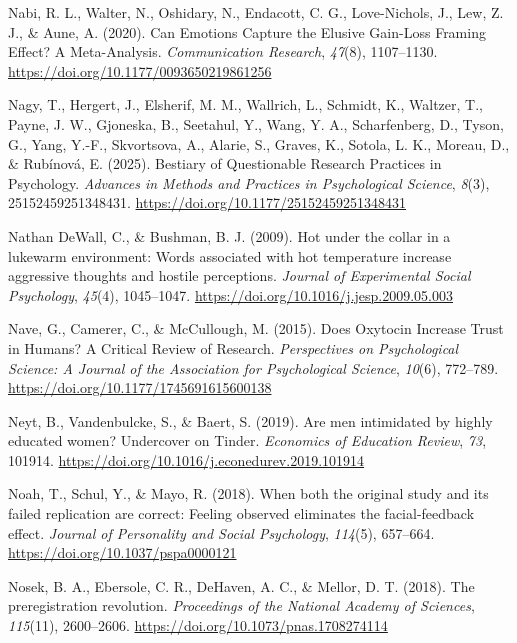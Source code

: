 \documentclass[
  letterpaper,
]{book}
\newlength{\cslhangindent}
\newenvironment{CSLReferences}[2] %
 {\begin{list}{}{%
  \setlength{\itemindent}{0pt}
  \setlength{\leftmargin}{0pt}
  \setlength{\parsep}{0pt}
  \ifodd #1
   \setlength{\leftmargin}{\cslhangindent}
   \setlength{\itemindent}{-1\cslhangindent}
  \fi
  \setlength{\itemsep}{#2\baselineskip}}}
 {\end{list}}
\begin{document}
\begin{CSLReferences}{1}{0}
Nabi, R. L., Walter, N., Oshidary, N., Endacott, C. G., Love-Nichols,
J., Lew, Z. J., \& Aune, A. (2020). Can {Emotions} {Capture} the
{Elusive} {Gain}-{Loss} {Framing} {Effect}? {A} {Meta}-{Analysis}.
\emph{Communication Research}, \emph{47}(8), 1107--1130.
\url{https://doi.org/10.1177/0093650219861256}

Nagy, T., Hergert, J., Elsherif, M. M., Wallrich, L., Schmidt, K.,
Waltzer, T., Payne, J. W., Gjoneska, B., Seetahul, Y., Wang, Y. A.,
Scharfenberg, D., Tyson, G., Yang, Y.-F., Skvortsova, A., Alarie, S.,
Graves, K., Sotola, L. K., Moreau, D., \& Rubínová, E. (2025). Bestiary
of {Questionable} {Research} {Practices} in {Psychology}. \emph{Advances
in Methods and Practices in Psychological Science}, \emph{8}(3),
25152459251348431. \url{https://doi.org/10.1177/25152459251348431}

Nathan DeWall, C., \& Bushman, B. J. (2009). Hot under the collar in a
lukewarm environment: {Words} associated with hot temperature increase
aggressive thoughts and hostile perceptions. \emph{Journal of
Experimental Social Psychology}, \emph{45}(4), 1045--1047.
\url{https://doi.org/10.1016/j.jesp.2009.05.003}

Nave, G., Camerer, C., \& McCullough, M. (2015). Does {Oxytocin}
{Increase} {Trust} in {Humans}? {A} {Critical} {Review} of {Research}.
\emph{Perspectives on Psychological Science: A Journal of the
Association for Psychological Science}, \emph{10}(6), 772--789.
\url{https://doi.org/10.1177/1745691615600138}

Neyt, B., Vandenbulcke, S., \& Baert, S. (2019). Are men intimidated by
highly educated women? {Undercover} on {Tinder}. \emph{Economics of
Education Review}, \emph{73}, 101914.
\url{https://doi.org/10.1016/j.econedurev.2019.101914}

Noah, T., Schul, Y., \& Mayo, R. (2018). When both the original study
and its failed replication are correct: {Feeling} observed eliminates
the facial-feedback effect. \emph{Journal of Personality and Social
Psychology}, \emph{114}(5), 657--664.
\url{https://doi.org/10.1037/pspa0000121}

Nosek, B. A., Ebersole, C. R., DeHaven, A. C., \& Mellor, D. T. (2018).
The preregistration revolution. \emph{Proceedings of the National
Academy of Sciences}, \emph{115}(11), 2600--2606.
\url{https://doi.org/10.1073/pnas.1708274114}


\end{CSLReferences}
\end{document}
